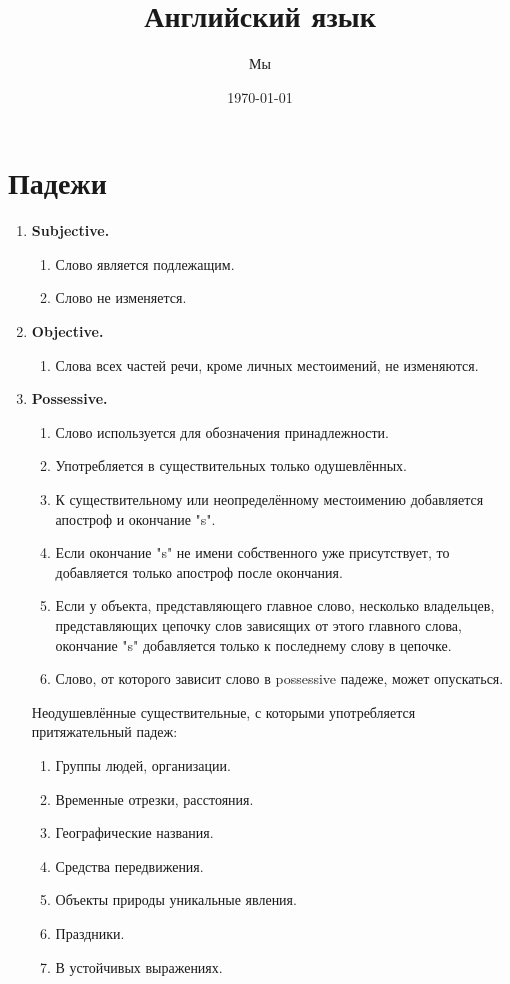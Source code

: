 \documentclass[oneside]{book}
\title{Английский язык}
\date{\today}
\author{Мы}
\begin{document}
	\maketitle

	\tableofcontents

	\chapter{Падежи}
	\begin{enumerate}
		\item \textbf{Subjective.}
		\begin{enumerate}
			\item Слово является подлежащим.
			\item Слово не изменяется.
		\end{enumerate}

		\item \textbf{Objective.}
		\begin{enumerate}
			\item Слова всех частей речи, кроме личных
			местоимений, не изменяются.
		\end{enumerate}

		\item \textbf{Possessive.}
		\begin{enumerate}
			\item Слово используется для обозначения
			принадлежности.

			\item Употребляется в существительных
			только одушевлённых.

			\item К существительному или неопределённому
			местоимению добавляется апостроф
			и окончание "s".

			\item Если окончание "s" не имени собственного
			уже присутствует, то добавляется
			только апостроф после окончания.

			\item Если у объекта, представляющего
			главное слово, несколько владельцев,
			представляющих цепочку слов зависящих от этого главного слова,
			окончание "s" добавляется
			только к последнему слову в цепочке.

			\item Слово, от которого зависит
			слово в possessive падеже,
			может опускаться.
		\end{enumerate}

		Неодушевлённые существительные,
		с которыми употребляется
		притяжательный падеж:
		\begin{enumerate}
			\item Группы людей, организации.
			\item Временные отрезки, расстояния.
			\item Географические названия.
			\item Средства передвижения.
			\item Объекты природы уникальные явления.
			\item Праздники.
			\item В устойчивых выражениях.
		\end{enumerate}
	\end{enumerate}
\end{document}
